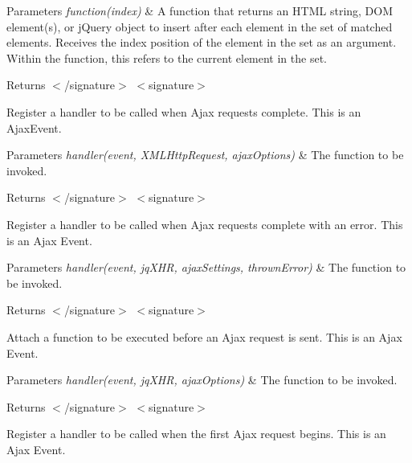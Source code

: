 \begin{DoxyParams}{Parameters}
{\em function(index)} & A function that returns an H\+T\+ML string, D\+OM element(s), or j\+Query object to insert after each element in the set of matched elements. Receives the index position of the element in the set as an argument. Within the function, this refers to the current element in the set.\\
\hline
\end{DoxyParams}
\begin{DoxyReturn}{Returns}
$<$/signature$>$ $<$signature$>$ 

Register a handler to be called when Ajax requests complete. This is an Ajax\+Event.
\end{DoxyReturn}

\begin{DoxyParams}{Parameters}
{\em handler(event, X\+M\+L\+Http\+Request, ajax\+Options)} & The function to be invoked.\\
\hline
\end{DoxyParams}
\begin{DoxyReturn}{Returns}
$<$/signature$>$ $<$signature$>$ 

Register a handler to be called when Ajax requests complete with an error. This is an Ajax Event.
\end{DoxyReturn}

\begin{DoxyParams}{Parameters}
{\em handler(event, jq\+X\+H\+R, ajax\+Settings, thrown\+Error)} & The function to be invoked.\\
\hline
\end{DoxyParams}
\begin{DoxyReturn}{Returns}
$<$/signature$>$ $<$signature$>$ 

Attach a function to be executed before an Ajax request is sent. This is an Ajax Event.
\end{DoxyReturn}

\begin{DoxyParams}{Parameters}
{\em handler(event, jq\+X\+H\+R, ajax\+Options)} & The function to be invoked.\\
\hline
\end{DoxyParams}
\begin{DoxyReturn}{Returns}
$<$/signature$>$ $<$signature$>$ 

Register a handler to be called when the first Ajax request begins. This is an Ajax Event.
\end{DoxyReturn}

